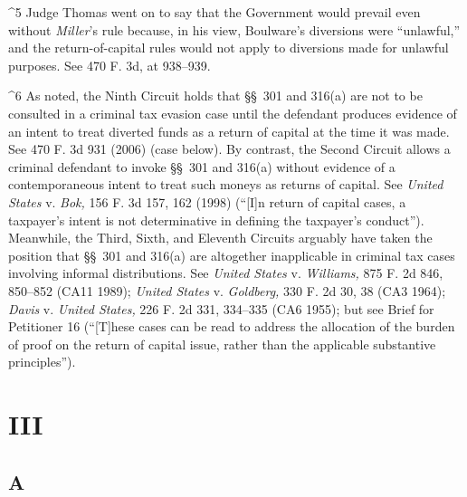 ^5 Judge Thomas went on to say that the Government would prevail
even without \emph{Miller}'s rule because, in his view, Boulware's
diversions were ``unlawful,'' and the return-of-capital rules would
not apply to diversions made for unlawful purposes. See 470 F. 3d, at
938--939.

^6 As noted, the Ninth Circuit holds that \S\S~301 and 316(a) are not
to be consulted in a criminal tax evasion case until the defendant
produces evidence of an intent to treat diverted funds as a return
of capital at the time it was made. See 470 F. 3d 931 (2006) (case
below). By contrast, the Second Circuit allows a criminal defendant to
invoke \S\S~301 and 316(a) without evidence of a contemporaneous intent
to treat such moneys as returns of capital. See \emph{United States}
v. \emph{Bok,} 156 F. 3d 157, 162 (1998) (``[I]n return of capital
cases, a taxpayer's intent is not determinative in defining the
taxpayer's conduct''). Meanwhile, the Third, Sixth, and Eleventh
Circuits arguably have taken the position that \S\S~301 and 316(a)
are altogether inapplicable in criminal tax cases involving informal
distributions. See \emph{United States} v. \emph{Williams,} 875 F. 2d 846,
850--852 (CA11 1989); \emph{United States} v. \emph{Goldberg,} 330 F. 2d 30,
38 (CA3 1964); \emph{Davis} v. \emph{United States,} 226 F. 2d 331, 334--335
(CA6 1955); but see Brief for Petitioner 16 (``[T]hese cases can be
read to address the allocation of the burden of proof on the return of
capital issue, rather than the applicable substantive principles'').
\newpage 

\section{III}

\subsection{A}

